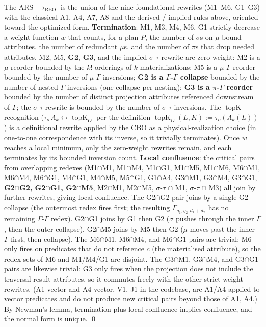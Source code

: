 \documentclass[sigconf]{acmart}
\theoremstyle{plain}
\theoremstyle{definition}
\newcommand{\topK}{\operatorname{topK}}
\theoremstyle{remark}
\begin{document}
The ARS $\to_{\mathrm{RBO}}$ is the union of the nine
foundational rewrites (M1--M6, G1--G3) with the classical A1, A4,
A7, A8 and the derived / implied rules above, oriented toward the
optimized form. \textbf{Termination}: M1, M3, M4, M6, G1 strictly
decrease a weight function $w$ that counts, for a plan $P$,
the number of $\sigma$s on $\mu$-bound attributes, the number
of redundant $\mu$s, and the number of $\pi$s that drop needed
attributes. M2, M5, \textbf{G2}, \textbf{G3}, and the implied
$\sigma$-$\tau$ rewrite are zero-weight: M2 is a $\mu$-reorder
bounded by the $k!$ orderings of $k$ materializations; M5 is a
$\mu$-$\Gamma$ reorder bounded by the number of
$\mu$-$\Gamma$ inversions; \textbf{G2 is a $\Gamma$-$\Gamma$
collapse} bounded by the number of nested-$\Gamma$ inversions
(one collapse per nesting); \textbf{G3 is a $\pi$-$\Gamma$
reorder} bounded by the number of distinct projection
attributes referenced downstream of $\Gamma$; the $\sigma$-$\tau$
rewrite is bounded by the number of $\sigma$-$\tau$ inversions.
The $\topK$ recognition ($\tau_o\,\Lambda_k \leftrightarrow
\topK_O$ per the definition
$\topK_O(L, K):= \tau_o(\Lambda_k(L))$) is a definitional
rewrite applied by the CBO as a physical-realization choice
(in one-to-one correspondence with its inverse, so it
trivially terminates). Once $w$ reaches a local minimum,
only the zero-weight rewrites remain, and each terminates
by its bounded inversion count. \textbf{Local confluence}: the
critical pairs from overlapping redexes
(M1$\cap$M1, M1$\cap$M4, M1$\cap$G1, M1$\cap$M5,
M1$\cap$M6, M6$\cap$M1, M6$\cap$M4, M6$\cap$G1,
M4$\cap$G1, M4$\cap$M5, M5$\cap$G1, G1$\cap$A4,
G3$\cap$M1, G3$\cap$M4, G3$\cap$G1,
\textbf{G2$\cap$G2, G2$\cap$G1, G2$\cap$M5},
M2$\cap$M1, M2$\cap$M5, $\sigma$-$\tau$ $\cap$ M1,
$\sigma$-$\tau$ $\cap$ M3) all join by further rewrites,
giving local confluence. The G2$\cap$G2 pair joins by a
single G2 collapse (the outermost redex fires first; the
resulting $\Gamma_{g_1;g_2,d_1+d_2}$ has no remaining
$\Gamma$-$\Gamma$ redex). G2$\cap$G1 joins by G1 then G2
($\sigma$ pushes through the inner $\Gamma$, then the outer
collapse). G2$\cap$M5 joins by M5 then G2 ($\mu$ moves past
the inner $\Gamma$ first, then collapse). The M6$\cap$M1,
M6$\cap$M4, and M6$\cap$G1 pairs are trivial: M6 only fires
on predicates that do not reference $c$ (the materialised
attribute), so the redex sets of M6 and M1/M4/G1 are
disjoint. The G3$\cap$M1, G3$\cap$M4, and G3$\cap$G1 pairs
are likewise trivial: G3 only fires when the projection does
not include the traversal-result attributes, so it commutes
freely with the other strict-weight rewrites. (A1-vector and
A4-vector, V1, J1 in the codebase, are A1/A4 applied to
vector predicates and do not produce new critical pairs beyond
those of A1, A4.) By Newman's lemma, termination plus
local confluence implies confluence, and the normal form is
unique. \qed
\end{document}
